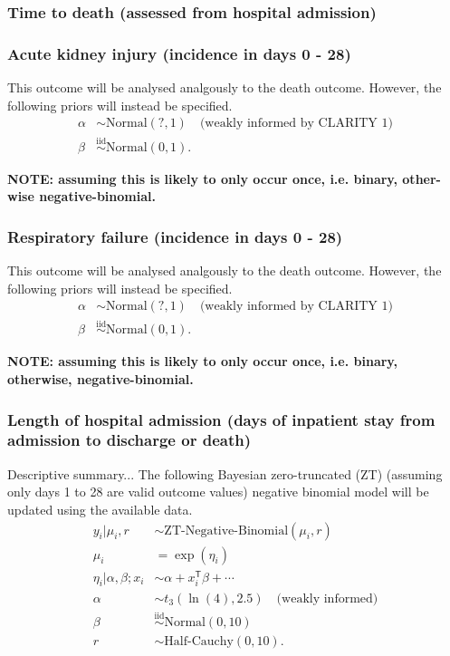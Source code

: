 \documentclass[11pt,parskip=full-]{scrartcl}
\begin{document}
\subsubsection{Time to death (assessed from hospital admission)}


\subsubsection{Acute kidney injury (incidence in days 0 - 28)}
This outcome will be analysed analgously to the death outcome. However, the following priors will instead be specified.
$$
    \begin{aligned}
        \alpha & \sim \text{Normal}(?, 1) \quad \text{(weakly informed by CLARITY 1)} \\
        \beta &\overset{\text{iid}}{\sim} \text{Normal}(0, 1).
    \end{aligned}
$$

\textbf{NOTE: assuming this is likely to only occur once, i.e. binary, other-wise negative-binomial.}

\subsubsection{Respiratory failure (incidence in days 0 - 28)}
This outcome will be analysed analgously to the death outcome. However, the following priors will instead be specified.
$$
    \begin{aligned}
        \alpha & \sim \text{Normal}(?, 1) \quad \text{(weakly informed by CLARITY 1)} \\
        \beta &\overset{\text{iid}}{\sim} \text{Normal}(0, 1).
    \end{aligned}
$$

\textbf{NOTE: assuming this is likely to only occur once, i.e. binary, otherwise, negative-binomial.}

\subsubsection{Length of hospital admission (days of inpatient stay from admission to discharge or death)}
Descriptive summary... The following Bayesian zero-truncated (ZT) (assuming only days 1 to 28 are valid outcome values) negative binomial model will be updated using the available data.
$$
    \begin{aligned}
        y_i|\mu_i,r &\sim \text{ZT-Negative-Binomial}(\mu_i, r) \\
        \mu_i &= \exp(\eta_i) \\
        \eta_i | \alpha, \beta; x_i &\sim \alpha + x_i^\mathsf{T}\beta + \cdots \\
        \alpha &\sim t_3(\ln(4), 2.5) \quad \text{(weakly informed)} \\
        \beta &\overset{\text{iid}}{\sim} \text{Normal}(0, 10) \\
        r &\sim \text{Half-Cauchy}(0, 10).
    \end{aligned}
$$
\end{document}

